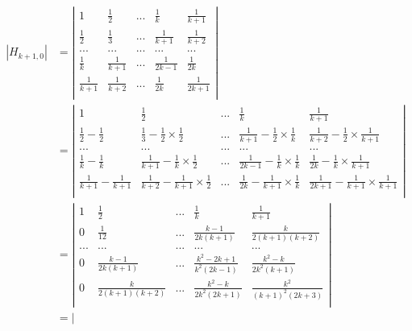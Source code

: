 \documentclass{article}
\begin{document}
\begin{equation}
    \begin{gathered}
     \begin{split}
|H_{k+1,0}|&=
\left|
\begin{matrix}
    1 & \frac{1}{2} & ... & \frac{1}{k} & \frac{1}{k+1}\\
    \frac{1}{2} & \frac{1}{3} & ... & \frac{1}{k+1} & \frac{1}{k+2}\\
    ... & ... & ... & ... & ...\\
    \frac{1}{k} & \frac{1}{k+1} & ... & \frac{1}{2k-1} & \frac{1}{2k}\\
    \frac{1}{k+1} & \frac{1}{k+2} & ... & \frac{1}{2k} & \frac{1}{2k+1}\\
\end{matrix}
\right|\\
&=\left|
\begin{matrix}
    1 & \frac{1}{2} & ... & \frac{1}{k} & \frac{1}{k+1}\\
    \frac{1}{2}-\frac{1}{2} & \frac{1}{3}-\frac{1}{2}\times \frac{1}{2} & ... & \frac{1}{k+1}-\frac{1}{2}\times \frac{1}{k} & \frac{1}{k+2}-\frac{1}{2}\times \frac{1}{k+1}\\
    ... & ... & ... & ... & ...\\
    \frac{1}{k}-\frac{1}{k} & \frac{1}{k+1}-\frac{1}{k}\times \frac{1}{2} & ... & \frac{1}{2k-1}-\frac{1}{k}\times \frac{1}{k} & \frac{1}{2k}-\frac{1}{k}\times \frac{1}{k+1}\\
    \frac{1}{k+1}-\frac{1}{k+1} & \frac{1}{k+2}-\frac{1}{k+1}\times \frac{1}{2} & ... & \frac{1}{2k}-\frac{1}{k+1}\times \frac{1}{k} & \frac{1}{2k+1}-\frac{1}{k+1}\times \frac{1}{k+1}\\
\end{matrix}
\right|\\
&=\left|
\begin{matrix}
    1 & \frac{1}{2} & ... & \frac{1}{k} & \frac{1}{k+1}\\
    0 & \frac{1}{12} & ... & \frac{k-1}{2k(k+1)} & \frac{k}{2(k+1)(k+2)}\\
    ... & ... & ... & ... & ...\\
    0 & \frac{k-1}{2k(k+1)} & ... & \frac{k^2-2k+1}{k^2(2k-1)} & \frac{k^2-k}{2k^2(k+1)}\\
    0 & \frac{k}{2(k+1)(k+2)} & ... & \frac{k^2-k}{2k^2(2k+1)} & \frac{k^2}{(k+1)^2(2k+3)}\\
\end{matrix}
\right|\\
&=\left|
\begin{matrix}

\end{matrix}
\end{split}
\end{gathered}
\end{equation}
\end{document}
